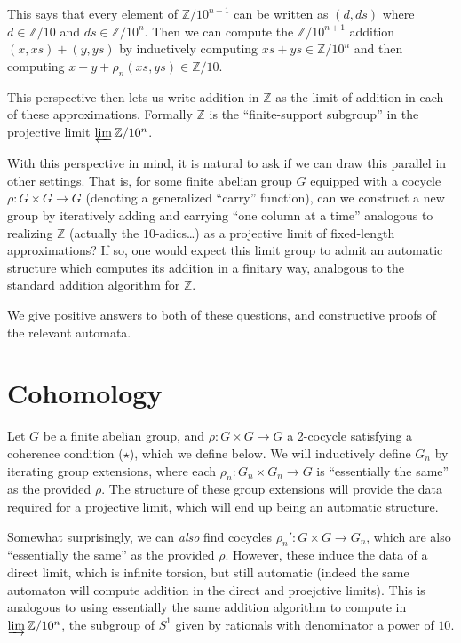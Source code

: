 \documentclass[12pt]{article}
\theoremstyle{definition}
\newcommand{\Z}{\mathbb{Z}}
\newcommand{\dirlim}{\varinjlim}
\renewcommand{\projlim}{\varprojlim}
\begin{document}
  This says that every element of $\Z / 10^{n+1}$ can be written as 
  $(d,ds)$ where $d \in \Z / 10$ and $ds \in \Z / 10^n$. 
  Then we can compute the $\Z / 10^{n+1}$ addition $(x,xs) + (y,ys)$ by 
  inductively computing $xs + ys \in \Z / 10^n$ and then computing 
  $x + y + \rho_n(xs,ys) \in \Z / 10$.

  This perspective then lets us write addition in $\Z$ as the limit of 
  addition in each of these approximations. Formally $\Z$ is the 
  ``finite-support subgroup'' in the projective limit $\projlim \Z / 10^n$.

  \bigskip

  With this perspective in mind, it is natural to ask if we can draw this 
  parallel in other settings. That is, for some finite abelian group $G$
  equipped with a cocycle $\rho : G \times G \to G$ 
  (denoting a generalized ``carry'' function), can we construct a new group by 
  iteratively adding and carrying ``one column at a time'' analogous to
  realizing $\Z$ (actually the $10$-adics\ldots) as a projective limit of 
  fixed-length approximations? If so, one would expect this limit group to
  admit an automatic structure which computes its addition in a finitary way,
  analogous to the standard addition algorithm for $\Z$.

  We give positive answers to both of these questions, and constructive 
  proofs of the relevant automata.

  \section{Cohomology}
  Let $G$ be a finite abelian group, and $\rho : G \times G \to G$ a 
  2-cocycle satisfying a coherence condition ($\star$), which we define below. 
  We will inductively define $G_n$ by iterating group extensions,
  where each $\rho_n : G_n \times G_n \to G$ is ``essentially the same'' as
  the provided $\rho$. The structure of these group extensions will provide the
  data required for a projective limit, which will end up being an automatic
  structure. 
  
  Somewhat surprisingly, we can \emph{also} find cocycles 
  $\rho_n' : G \times G \to G_n$, which are also ``essentially the same'' as
  the provided $\rho$. However, these induce the data of a direct limit,
  which is infinite torsion, but still automatic 
  (indeed the same automaton will compute addition in the direct and 
  proejctive limits). This is analogous to using essentially the same addition
  algorithm to compute in $\dirlim \Z / 10^n$, the subgroup of $S^1$ given by
  rationals with denominator a power of $10$.
\end{document}

